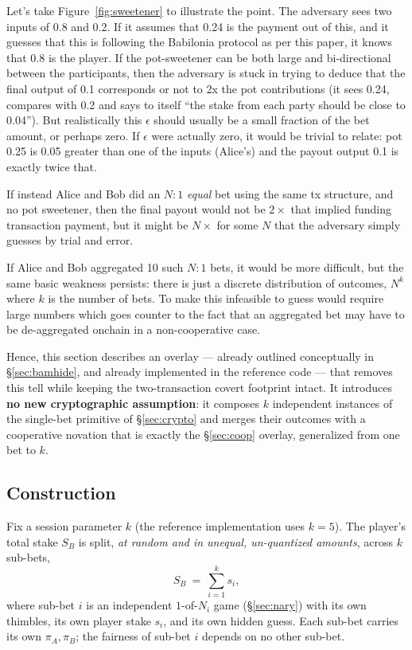 \documentclass[11pt]{article}
\begin{document}
Let's take Figure~\ref{fig:sweetener} to illustrate the point. The adversary sees two inputs of 0.8 and 0.2. If it assumes that 0.24 is the payment out of this, and it guesses that this is following the Babilonia protocol as per this paper, it knows that 0.8 is the player. If the pot-sweetener can be both large and bi-directional between the participants, then the adversary is stuck in trying to deduce that the final output of 0.1 corresponds or not to 2x the pot contributions (it sees 0.24, compares with 0.2 and says to itself ``the stake from each party should be close to 0.04''). But realistically this $\epsilon$ should usually be a small fraction of the bet amount, or perhaps zero. If $\epsilon$ were actually zero, it would be trivial to relate: pot 0.25 is 0.05 greater than one of the inputs (Alice's) and the payout output 0.1 is exactly twice that.

If instead Alice and Bob did an $N:1$ \emph{equal} bet using the same tx structure, and no pot sweetener, then the final payout would not be $2 \times$ that implied funding transaction payment, but it might be $N \times$ for some $N$ that the adversary simply guesses by trial and error.

If Alice and Bob aggregated 10 such $N:1$ bets, it would be more difficult, but the same basic weakness persists: there is just a discrete distribution of outcomes, $N^k$ where $k$ is the number of bets. To make this infeasible to guess would require large numbers which goes counter to the fact that an aggregated bet may have to be de-aggregated onchain in a non-cooperative case.

Hence, this section describes an overlay --- already outlined conceptually in \S\ref{sec:bamhide}, and already implemented in the reference code \cite{babilonia} --- that removes this tell while keeping the two-transaction covert footprint intact. It introduces \textbf{no new cryptographic assumption}: it composes $k$ independent instances of the single-bet primitive of \S\ref{sec:crypto} and merges their outcomes with a cooperative novation that is exactly the \S\ref{sec:coop} overlay, generalized from one bet to $k$.

\subsection{Construction}

Fix a session parameter $k$ (the reference implementation uses $k=5$). The player's total stake $S_B$ is split, \emph{at random and in unequal, un-quantized amounts}, across $k$ sub-bets,
\[
S_B \ =\ \sum_{i=1}^{k} s_i ,
\]
where sub-bet $i$ is an independent $1$-of-$N_i$ game (\S\ref{sec:nary}) with its own thimbles, its own player stake $s_i$, and its own hidden guess. Each sub-bet carries its own $\pi_A,\pi_B$; the fairness of sub-bet $i$ depends on no other sub-bet.
\end{document}
